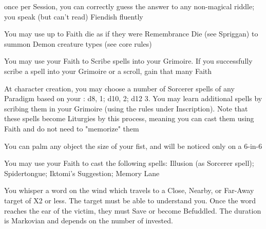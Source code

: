 {\GOD[
Name=Cthulhu,
Link=small-god-cthulhu,
GodOf=Arbiter of Mysteries and Riddles,
Holy=A piece of jewelry depicting an octopus
]


once per Session, you can correctly guess the answer to any non-magical riddle; you speak (but can't read) Fiendish fluently


You may use up to \LVL Faith die as if they were Remembrance Die (see Spriggan) to summon Demon creature types (see core rules)




\GOD[
Name=Hecate,
Link=small-god-hecate,
GodOf=Archfiend of Wizardry,
Holy=your Grimoire
]


You may use your Faith to Scribe spells into your Grimoire. If you successfully scribe a spell into your Grimoire or a scroll, gain that many Faith


At character creation, you may choose a number of Sorcerer spells of any Paradigm based on your \INT:  d8, 1; d10, 2; d12 3.  You may learn additional spells by scribing them in your Grimoire (using the rules under Inscription).  Note that these spells become Liturgies by this process, meaning you can cast them using Faith and do not need to "memorize" them




\GOD[
Name=Iktomi,
Link=small-god-iktomi,
GodOf=God of Tricksters,
Holy=a small puppet worn from the belt or neck
]


You can palm any object the size of your fist, and will be noticed only on a 6-in-6


You may use your Faith to cast the following spells: Illusion (as Sorcerer spell); Spidertongue; Iktomi's Suggestion; Memory Lane

\LITURGY [
  Name= Iktomi's Suggestion,
  Link= iktomi-liturgy-iktomis-suggestion,
  Paradigm= Mind ,
  Save=  Y (negates) ,
  Duration= Markovian ,
  Counter=  n/a  ,
  Keywords= None ,
  Target=   Close; Nearby; or Far-Away creature
]



You whisper a word on the wind which travels to a Close, Nearby, or Far-Away target of \DICE X2 \HD or less. The target must be able to understand you.  Once the word reaches the ear of the victim, they must Save or become Befuddled.  The duration is Markovian and depends on the number of \DICE invested.
\LITURGY [
  Name= Memory Lane,
  Link=iktomi-liturgy-memory-lane,
  Paradigm= Mind ,
  Save=  Y (negates) ,
  Duration= Varies ,
  Counter=  n/a  ,
  Keywords= Splittable ,
  Target=   Close creature(s)
]



}
